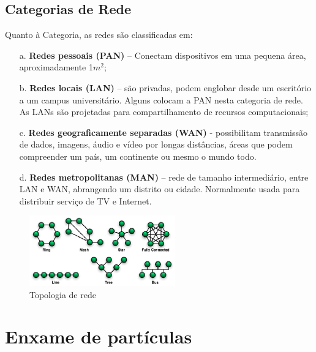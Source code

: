 \documentclass[conference,compsoc]{IEEEtran}
\begin{document}
\subsection{Categorias de Rede}
Quanto à Categoria, as redes são classificadas em:
\begin{enumerate}
	\item[a.]\textbf{Redes pessoais (PAN) }	– Conectam dispositivos em uma pequena área, aproximadamente 1$m^2$;  
	\item[b.]\textbf{Redes locais (LAN) } – são privadas, podem englobar desde um escritório a um campus universitário.  Alguns colocam a PAN nesta categoria de rede. As LANs são projetadas para compartilhamento de recursos computacionais;
	\item[c.]\textbf{Redes geograficamente separadas (WAN)} - possibilitam transmissão de dados, imagens, áudio e vídeo por longas distâncias, áreas que podem compreender um país, um continente ou mesmo o mundo todo.  
	\item[d.]\textbf{ Redes metropolitanas (MAN)} – rede de tamanho intermediário, entre LAN e WAN, abrangendo um distrito ou cidade. Normalmente usada para distribuir serviço de TV e Internet.
\end{enumerate}


\begin{figure}[!htb]
\centering
\caption{Topologia de rede }
\includegraphics[width=63mm]{Figuras/Topologies.eps}

\end{figure}



\section{Enxame de partículas}\label{arte:enxames}
\end{document}
